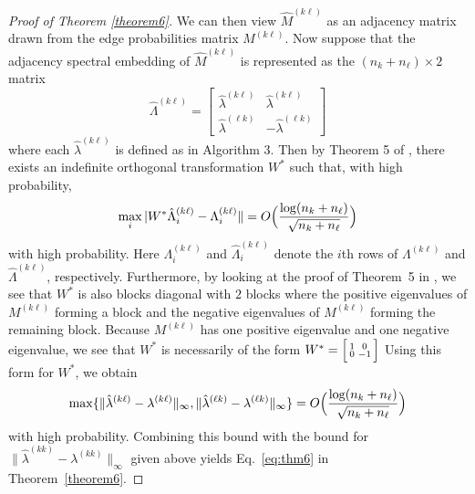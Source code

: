 \documentclass[12pt]{article}
\begin{document}
\begin{proof}[Proof of Theorem \ref{theorem6}]
We can then view \(\hat{M}^{(k \ell)}\) as an adjacency matrix drawn from
the edge probabilities matrix \(M^{(k \ell)}\). Now suppose that the adjacency spectral
embedding of $\hat{M}^{(k \ell)}$ is represented as the $(n_k +
n_{\ell}) \times 2$ matrix
\[\hat{\Lambda}^{(k \ell)} = \begin{bmatrix} 
  \hat{\lambda}^{(k \ell)} & \hat{\lambda}^{(k \ell)} \\ 
  \hat{\lambda}^{(\ell k)} & -\hat{\lambda}^{(\ell k)} 
\end{bmatrix}\]
where each \(\hat{\lambda}^{(k \ell)}\) is defined as in Algorithm 3. Then
by Theorem 5 of \citet{rubindelanchy2017statistical}, there
exists an indefinite orthogonal transformation $W^{*}$ such that,  with
high probability,
$$\max_{i} |W^{*} \hat{\Lambda}_{i}^{(k \ell)} - \Lambda_{i}^{(k \ell)} \| =
O\Bigl(\frac{\log (n_k + n_{\ell})}{\sqrt{n_k + n_{\ell}}}\Bigr)$$
with high probability. Here $\Lambda_{i}^{(k \ell)}$ and
$\hat{\Lambda}_i^{(k \ell)}$ denote the $i$th rows of $\Lambda^{(k
  \ell)}$ and $\hat{\Lambda}^{(k \ell)}$, respectively. 
Furthermore, by looking at the proof of Theorem~5 in
\citep{rubindelanchy2017statistical}, we see that $W^{*}$ is also
blocks diagonal with $2$ blocks where the positive eigenvalues of $M^{(k \ell)}$
forming a block and the negative eigenvalues of $M^{(k \ell)}$ forming
the remaining block. %
Because $M^{(k \ell)}$ has one positive eigenvalue and one negative
eigenvalue, we see that $W^{*}$ is necessarily of the form $W^{*}
= \Bigl[\begin{smallmatrix} 1 & 0 \\ 0 & - 1\end{smallmatrix}\Bigr]$
Using this form for $W^{*}$, we obtain
$$\max\{\|\hat{\lambda}^{(k \ell)} - \lambda^{(k \ell)}\|_{\infty},
\|\hat{\lambda}^{(\ell k)} - \lambda^{(\ell k)}\|_{\infty}\}  =
O\Bigl(\frac{\log(n_k + n_{\ell})}{\sqrt{n_k + n_{\ell}}}\Bigr)$$
with high probability. Combining this bound with the bound for
$\|\hat{\lambda}^{(kk)} - \lambda^{(kk)}\|_{\infty}$ given above
yields Eq.~\eqref{eq:thm6} in Theorem~\ref{theorem6}. 
\end{proof}
\end{document}
